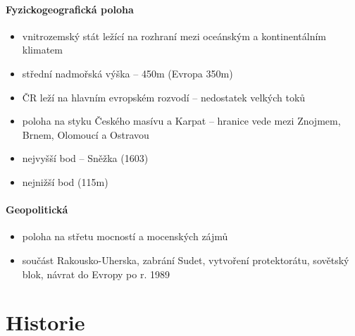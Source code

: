\paragraph{Fyzickogeografická poloha}
\begin{itemize}
\item vnitrozemský stát ležící na rozhraní mezi oceánským a kontinentálním klimatem
\item střední nadmořská výška -- 450m (Evropa 350m)
\item ČR leží na hlavním evropském rozvodí -- nedostatek velkých toků
\item poloha na styku Českého masívu a Karpat -- hranice vede mezi Znojmem, Brnem, Olomoucí a Ostravou
\item nejvyšší bod -- Sněžka (1603)
\item nejnižší bod (115m)
\end{itemize}

\paragraph{Geopolitická}
\begin{itemize}
\item poloha na střetu mocností a mocenských zájmů
\item součást Rakousko-Uherska, zabrání Sudet, vytvoření protektorátu, sovětský blok, návrat do Evropy po r. 1989
\end{itemize}

\section{Historie}
